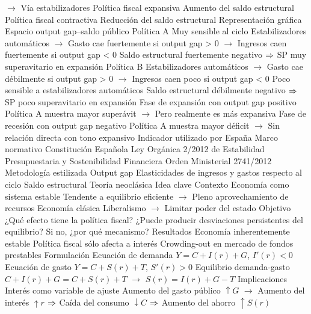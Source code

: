 \documentclass{nuevotema}
\begin{document}
\begin{esquemal}
				\4[] $\to$ Vía estabilizadores
			\3 Política fiscal expansiva
				\4 Aumento del saldo estructural
			\3 Política fiscal contractiva
				\4 Reducción del saldo estructural
			\3 Representación gráfica
				\4 Espacio output gap--saldo público
				\4 Política A
				\4[] Muy sensible al ciclo
				\4[] Estabilizadores automáticos
				\4[] $\to$ Gasto cae fuertemente si output gap > 0
				\4[] $\to$ Ingresos caen fuertemente si output gap < 0
				\4[] Saldo estructural fuertemente negativo
				\4[] $\Rightarrow$ SP muy superavitario en expansión
				\4 Política B
				\4[] Estabilizadores automáticos
				\4[] $\to$ Gasto cae débilmente si output gap > 0
				\4[] $\to$ Ingresos caen poco si output gap < 0
				\4[] Poco sensible a estabilizadores automáticos
				\4[] Saldo estructural débilmente negativo
				\4[] $\Rightarrow$ SP poco superavitario en expansión
				\4 
				\4 Fase de expansión con output gap positivo
				\4[] Política A muestra mayor superávit
				\4[] $\to$ Pero realmente es más expansiva
				\4 Fase de recesión con output gap negativo
				\4[] Política A muestra mayor déficit
				\4[] $\to$ Sin relación directa con tono expansivo
		\2 Indicador utilizado por España
			\3 Marco normativo
				\4 Constitución Española
				\4 Ley Orgánica 2/2012 de Estabilidad Presupuestaria y Sostenibilidad Financiera
				\4 Orden Ministerial 2741/2012
			\3 Metodología estilizada
				\4 Output gap
				\4 Elasticidades de ingresos y gastos respecto al ciclo
				\4 Saldo estructural
	\1 
		\2 Teoría neoclásica
			\3 Idea clave
				\4 Contexto
				\4[] Economía como sistema estable
				\4[] Tendente a equilibrio eficiente
				\4[] $\to$ Pleno aprovechamiento de recursos
				\4[] Economía clásica
				\4[] Liberalismo
				\4[] $\to$ Limitar poder del estado
				\4 Objetivo
				\4[] ¿Qué efecto tiene la política fiscal?
				\4[] ¿Puede producir desviaciones persistentes del equilibrio?
				\4[] Si no, ¿por qué mecanismo?
				\4 Resultados
				\4[] Economía inherentemente estable
				\4[] Política fiscal sólo afecta a interés
				\4[] Crowding-out en mercado de fondos prestables
			\3 Formulación
				\4 Ecuación de demanda
				\4[] $Y=C+I(r)+G$, $I'(r) <0$
				\4 Ecuación de gasto
				\4[] $Y=C+S(r)+T$, $S'(r) >0$
				\4 Equilibrio demanda-gasto
				\4[] $C+I(r)+G=C+S(r)+T$ $\to$ $S(r) = I(r) + G - T$
			\3 Implicaciones
				\4 Interés como variable de ajuste
				\4[] Aumento del gasto público $\uparrow G$
				\4[] $\to$ Aumento del interés $\uparrow r$
				\4[] $\Rightarrow$ Caída del consumo $\downarrow C$
				\4[] $\Rightarrow$ Aumento del ahorro $\uparrow S(r)$

\end{esquemal}
\end{document}
